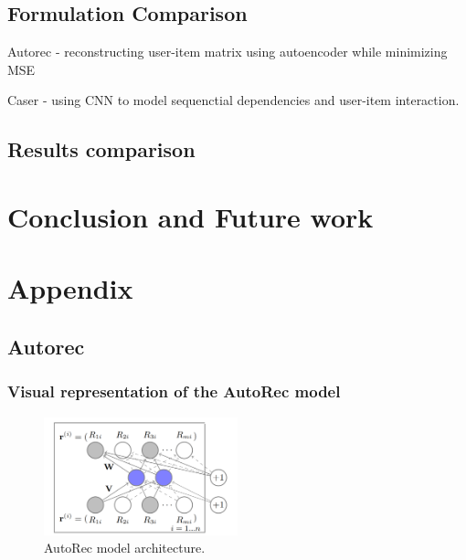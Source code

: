 \documentclass{ieeetj}
\begin{document}
\subsection{Formulation Comparison}
Autorec - reconstructing user-item matrix using autoencoder while minimizing MSE

Caser - using CNN to model sequenctial dependencies and user-item interaction.
\subsection{Results comparison}

\section{Conclusion and Future work}
\vfill\pagebreak





\appendix
\section{Appendix}
\subsection{Autorec}
\subsubsection{Visual representation of the AutoRec model}
\begin{figure}[h]
\centering
\includegraphics[width=0.5\textwidth]{figures/autorec.png}
\caption{AutoRec model architecture.}
\label{fig:autorec}
\end{figure}
\end{document}
